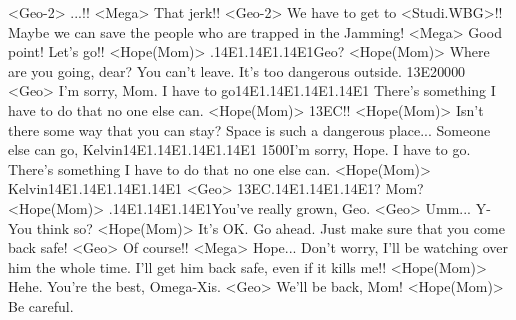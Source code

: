 <Geo-2> ...!! 
<Mega> That jerk!! 
<Geo-2> We have to get to <Studi.WBG>!! 
Maybe we can save the people who are trapped in the Jamming! 
<Mega> Good point! Let's go!! 
<Hope(Mom)> .{14}{E1}.{14}{E1}.{14}{E1}Geo? 
<Hope(Mom)> Where are you going, dear? 
You can't leave. It's too dangerous outside. 
{13}{E2}{00}{00} 
<Geo> I'm sorry, Mom. 
I have to go{14}{E1}.{14}{E1}.{14}{E1}.{14}{E1} 
There's something I have to do that no one else can. 
<Hope(Mom)> {13}{EC}!! 
<Hope(Mom)> Isn't there some way that you can stay? 
Space is such a dangerous place... Someone else can go, Kelvin{14}{E1}.{14}{E1}.{14}{E1}.{14}{E1} 
{15}{00}I'm sorry, Hope. 
I have to go. 
There's something I have to do that no one else can. 
<Hope(Mom)> Kelvin{14}{E1}.{14}{E1}.{14}{E1}.{14}{E1} 
<Geo> {13}{EC}.{14}{E1}.{14}{E1}.{14}{E1}? 
Mom? 
<Hope(Mom)> .{14}{E1}.{14}{E1}.{14}{E1}You've really grown, Geo. 
<Geo> Umm... Y-You think so? 
<Hope(Mom)> It's OK. Go ahead. 
Just make sure that you come back safe! 
<Geo> Of course!! 
<Mega> Hope... Don't worry, I'll be watching over him the whole time. 
I'll get him back safe, even if it kills me!! 
<Hope(Mom)> Hehe. You're the best, Omega-Xis. 
<Geo> We'll be back, Mom! 
<Hope(Mom)> Be careful. 
